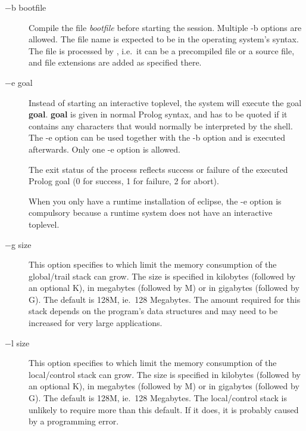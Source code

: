 \begin{description}
\item[$-$b bootfile] 
Compile the file {\it bootfile} before starting the session.
Multiple -b options are allowed.
The file name is expected to be in the operating system's syntax.
The file is processed by
,
i.e.\ it can be a precompiled file or a source file, and file extensions
are added as specified there.

\item[$-$e goal]
Instead of starting an interactive toplevel, the system will execute the
goal {\bf goal}. {\bf goal} is given in normal Prolog syntax, and has to be
quoted if it contains any characters that would normally be interpreted by the
shell. The -e option can be used together with the -b option and is executed
afterwards. Only one -e option is allowed.

The exit status of the {\eclipse} process reflects success or failure of the
executed Prolog goal (0 for success, 1 for failure, 2 for abort).

When you only have a runtime installation of eclipse, the -e option
is compulsory because a runtime system does not have an interactive
toplevel.


\item[$-$g size]
This option specifies to which limit the memory consumption of the
{\eclipse} global/trail stack can grow.
The size is specified in kilobytes (followed by an optional K), in megabytes
(followed by M) or in gigabytes (followed by G).
The default is 128M, ie.\ 128 Megabytes.
The amount required for this stack depends on the program's data
structures and may need to be increased for very large applications.

\item[$-$l size]
This option specifies to which limit the memory consumption of the
{\eclipse} local/control stack can grow.
The size is specified in kilobytes (followed by an optional K), in megabytes
(followed by M) or in gigabytes (followed by G).
The default is 128M, ie.\ 128 Megabytes.
The local/control stack is unlikely to require more than this default.
If it does, it is probably caused by a programming error.


\end{description}
